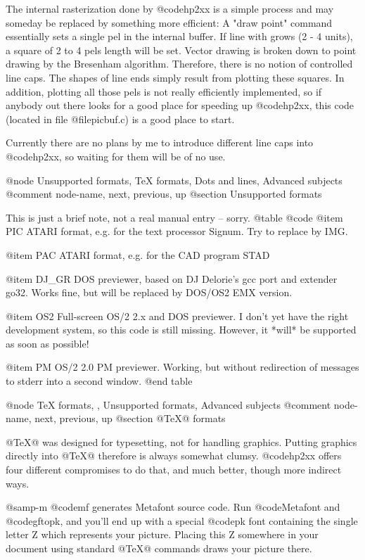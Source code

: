 The internal rasterization done by @code{hp2xx} is a simple process
and may someday be replaced by something more efficient: A "draw point"
command essentially sets a single pel in the internal buffer.
If line with grows (2 - 4 units), a square of 2 to 4 pels length will
be set. Vector drawing is broken down to point drawing by the
Bresenham algorithm. Therefore, there is no notion of controlled
line caps. The shapes of line ends simply result from plotting these squares.
In addition, plotting all those pels is not really efficiently implemented,
so if anybody out there looks for a good place for speeding up @code{hp2xx},
this code (located in file @file{picbuf.c}) is a good place to start.

Currently there are no plans by me to introduce different line caps
into @code{hp2xx}, so waiting for them will be of no use.




@node Unsupported formats, TeX formats, Dots and lines, Advanced subjects
@comment  node-name,  next,  previous,  up
@section Unsupported formats

This is just a brief note, not a real manual entry -- sorry.
@table @code
@item PIC
	ATARI format, e.g. for the text processor Signum. Try to replace by IMG.

@item PAC
	ATARI format, e.g. for the CAD program STAD

@item DJ_GR
	DOS previewer, based on DJ Delorie's gcc port and extender go32.
	Works fine, but will be replaced by DOS/OS2 EMX version.

@item OS2
	Full-screen OS/2 2.x and DOS previewer. I don't yet have the
	right development system, so this code is still missing.
	However, it *will* be supported as soon as possible!

@item PM
	OS/2 2.0 PM previewer. Working, but without redirection of
	messages to stderr into a second window.
@end table




@node TeX formats, , Unsupported formats, Advanced subjects
@comment  node-name,  next,  previous,  up
@section @TeX{}@  formats

@TeX{}@  was designed for typesetting, not for handling graphics. Putting
graphics directly into @TeX{}@  therefore is always somewhat clumsy.
@code{hp2xx} offers four different compromises to do that, and much
better, though more indirect ways.

@samp{-m @code{mf}} generates Metafont source code. Run @code{Metafont}
and @code{gftopk}, and you'll end up with a special @code{pk} font
containing the single letter Z which represents your picture. Placing
this Z somewhere in your document using standard @TeX{}@  commands
draws your picture there.

